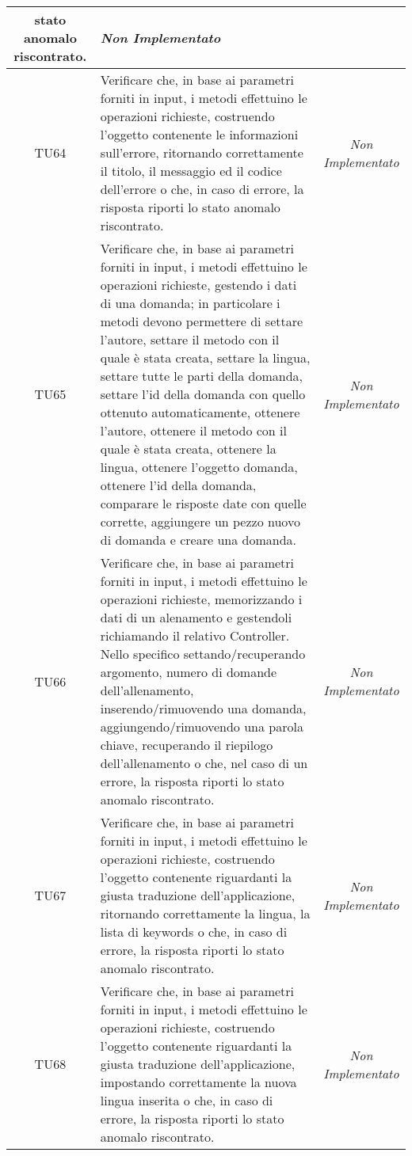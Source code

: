 \begin{longtable}{|c|>{}m{10cm}|c|}
stato anomalo riscontrato. & \textit{Non Implementato}\\ \hline
\hypertarget{TU64}{TU64} & Verificare che, in base ai parametri forniti in input,
i metodi effettuino le operazioni richieste, costruendo l’oggetto contenente le informazioni sull'errore,
ritornando correttamente il titolo, il messaggio ed il
codice dell’errore o che, in caso di errore, la risposta
riporti lo stato anomalo riscontrato. & \textit{Non Implementato}\\ \hline
\hypertarget{TU65}{TU65} & Verificare che, in base ai parametri forniti in input, i metodi effettuino le operazioni richieste, gestendo i dati di una domanda; in particolare i metodi devono permettere di settare l'autore, settare il metodo con il quale è stata creata, settare la lingua, settare tutte le parti della domanda, settare l'id della domanda con quello ottenuto automaticamente, ottenere l'autore, ottenere il metodo con il quale è stata creata, ottenere la lingua, ottenere l'oggetto domanda, ottenere l'id della domanda, comparare le risposte date con quelle corrette, aggiungere un pezzo nuovo di domanda e creare una domanda. & \textit{Non Implementato}\\ \hline
\hypertarget{TU66}{TU66} & Verificare che, in base ai parametri forniti in input, i metodi effettuino le operazioni richieste, memorizzando i dati di un alenamento e gestendoli richiamando il relativo Controller. Nello specifico settando/recuperando argomento, numero di domande dell'allenamento, inserendo/rimuovendo una domanda, aggiungendo/rimuovendo una parola chiave, recuperando il riepilogo dell'allenamento o che, nel caso di un errore, la risposta riporti lo stato anomalo riscontrato. & \textit{Non Implementato}\\ \hline
\hypertarget{TU67}{TU67} & Verificare che, in base ai parametri forniti in input,
i metodi effettuino le operazioni richieste, costruendo l’oggetto contenente riguardanti la giusta traduzione dell’applicazione, ritornando correttamente la lingua, la lista di keywords o che, in caso di errore, la risposta riporti lo stato anomalo riscontrato. & \textit{Non Implementato}\\ \hline
\hypertarget{TU68}{TU68} & Verificare che, in base ai parametri forniti in input,
i metodi effettuino le operazioni richieste, costruendo l’oggetto contenente riguardanti la giusta traduzione dell’applicazione, impostando correttamente la nuova lingua inserita o che, in caso di errore, la risposta riporti lo stato anomalo riscontrato. & \textit{Non Implementato}\\ \hline

\end{longtable}

